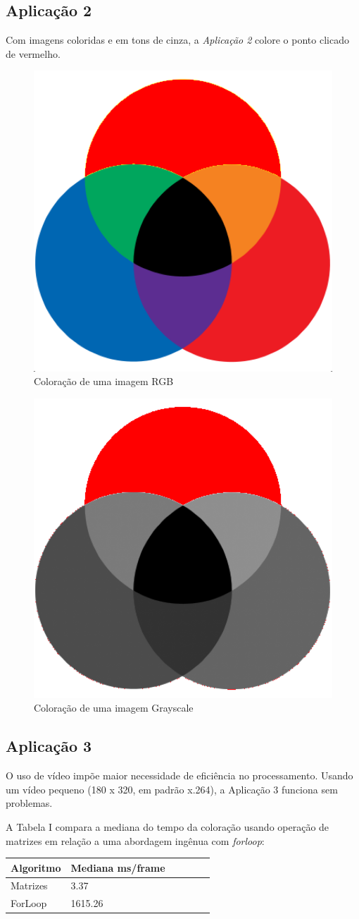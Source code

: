 \documentclass[conference]{IEEEtran}
\begin{document}
\subsection*{Aplicação 2}
Com imagens coloridas e em tons de cinza, a \textit{Aplicação 2} colore o ponto clicado de vermelho.
\begin{figure}[h!]
\begin{center}
\includegraphics[width=0.28\columnwidth]{requisito2_color.png}
\caption{Coloração de uma imagem RGB}
\end{center}
\end{figure}
\begin{figure}[h!]
\begin{center}
\includegraphics[width=0.28\columnwidth]{requisito2_gray.png}
\caption{Coloração de uma imagem Grayscale}
\end{center}
\end{figure}
\subsection*{Aplicação 3}
O uso de vídeo impõe maior necessidade de eficiência no processamento. Usando um vídeo pequeno (180 x 320, em padrão x.264), a Aplicação 3 funciona sem problemas.

A Tabela I compara a mediana do tempo da coloração usando operação de matrizes em relação a uma abordagem ingênua com \textit{forloop}:

\begin{minipage}{\linewidth}
\centering
{} \label{tab:title} 
\begin{tabular}{ C{.755in} C{.85in} *4{C{.75in}}}\toprule[1.5pt]
\bf Algoritmo & \bf Mediana ms/frame  \bf \\\midrule
Matrizes        &  3.37 \\
ForLoop        &  1615.26 \\
\bottomrule[1.25pt]
\end {tabular}\par

\end{minipage}
\end{document}
